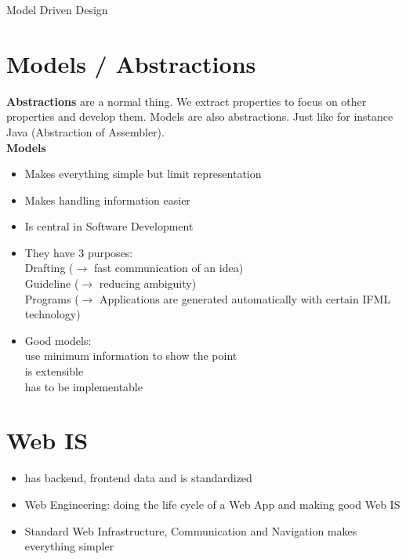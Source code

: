 \documentclass[a4paper]{article}
\begin{document}
{\huge Model Driven Design}

\section{Models / Abstractions}
{\bf Abstractions} are a normal thing. We extract properties to focus on other properties and develop them. Models are also abstractions. Just like for instance Java (Abstraction of Assembler).\\
{\bf Models}
\begin{itemize}
\setlength{\itemsep}{-3pt}
\item Makes everything simple but limit representation
\item Makes handling information easier
\item Is central in Software Development
\item They have 3 purposes: \\Drafting ($\rightarrow$ fast communication of an idea)
		\\Guideline ($\rightarrow$ reducing ambiguity)
		\\Programs ($\rightarrow$ Applications are generated automatically with certain IFML technology)
\item Good models:
		\\use minimum information to show the point
		\\is extensible
		\\has to be implementable
\end{itemize}

\section{Web IS}
\begin{itemize}
\setlength{\itemsep}{-3pt}
\item has backend, frontend data and is standardized
\item Web Engineering: doing the life cycle of a Web App and making good Web IS
\item Standard Web Infrastructure, Communication and Navigation makes everything simpler
\end{itemize}
\end{document}

